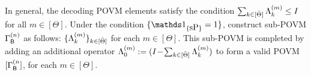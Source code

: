 In general, the decoding POVM elements satisfy the condition $\sum_{k \in [\bar{\Theta}]} \Lambda_{k}^{(m)} \leq I$ for all $m \in [\Theta].$
Under the condition $\{\I_{\{\mbox{sP}\}} = 1\}$,
construct sub-POVM $\Gamma_{\mathsf{B}}^{(n)}$ as follows: $\{\Lambda_{k}^{(m)}\}_{k\in [\bar{\Theta}]}$ for each $m\in[\Theta]$. This sub-POVM is completed by adding an additional operator $\Lambda_{0}^{(m)}:=(I\!-\!\sum_{k\in[\bar{\Theta}]}\Lambda_k^{(m)})$ to form a valid POVM $[\Gamma_{\mathsf{B}}^{(n}]$, for each $m\in [\Theta]$.


